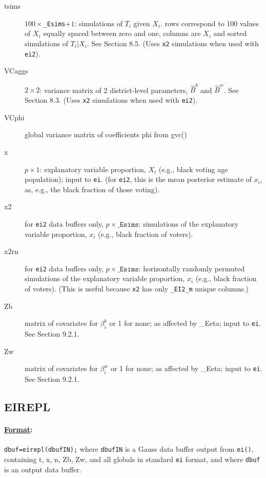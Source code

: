 \documentclass[11pt,titlepage]{article}
\begin{document}
\begin{description}
\item[tsims] $100\times$\texttt{\_Esims}$+1$: simulations of $T_i$
  given $X_i$.  rows correspond to 100 values of $X_i$ equally spaced
  between zero and one, columns are $X_i$ and sorted simulations of
  $T_i|X_i$.  See Section 8.5.  (Uses \texttt{x2} simulations when
  used with \texttt{ei2}).

\item[VCaggs] $2\times 2$: variance matrix of 2 district-level
  parameters, $\hat{B}^b$ and $\hat{B}^w$.  See Section 8.3.  (Uses
  \texttt{x2} simulations when used with \texttt{ei2}).

\item[VCphi] global variance matrix of coefficients phi from gvc()

\item[x] $p\times 1$: explanatory variable proportion, $X_i$ (e.g.,
  black voting age population); input to \texttt{ei}.  (for
  \texttt{ei2}, this is the mean posterior estimate of $x_i$, as,
  e.g., the black fraction of those voting).

\item[x2] for \texttt{ei2} data buffers only,
  $p\times\texttt{\_Esims}$: simulations of the explanatory variable
  proportion, $x_i$ (e.g., black fraction of voters).

\item[x2rn] for \texttt{ei2} data buffers only,
  $p\times\texttt{\_Esims}$: horizontally randomly permuted
  simulations of the explanatory variable proportion, $x_i$ (e.g.,
  black fraction of voters).  (This is useful because \texttt{x2} has
  only \texttt{\_EI2\_m} unique columns.)

\item[Zb] matrix of covariates for $\beta_i^b$ or 1 for none; as
  affected by \_Eeta; input to \texttt{ei}.  See Section 9.2.1.

\item[Zw] matrix of covariates for $\beta_i^w$ or 1 for none; as
  affected by \_Eeta; input to \texttt{ei}.  See Section
  9.2.1.
\end{description}

\subsection{EIREPL}

\paragraph{\underline{Format}:} \texttt{dbuf=eirepl(dbufIN);}
where \texttt{dbufIN} is a Gauss data buffer output from
\texttt{ei()}, containing t, x, n, Zb, Zw, and all globals in standard
\texttt{ei} format, and where \texttt{dbuf} is an output data buffer.
\end{document}

